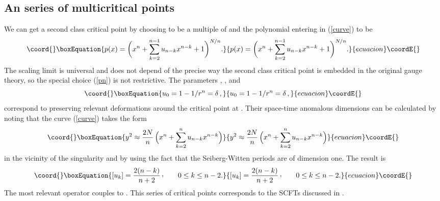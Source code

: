 \documentclass[a4paper,12pt]{article}
\def\cvp{\raise 2pt\hbox{,}}
\begin{document}
{\subsection{An \coordHE{} series of multicritical points}
%
We can get a second class \coordHE{} critical point by choosing \coordHE{} to be a 
multiple of \coordHE{} and the polynomial \coordHE{} entering in (\ref{curve}) to be
%
\begin{equation}\coord{}\boxEquation{
\label{pn}
p(x) = \biggl( x^{n} + \sum_{k=2}^{n-1} u_{n-k} x^{n-k} + 1 \biggr)^{N/n}.
}{
p(x) = \biggl( x^{n} + \sum_{k=2}^{n-1} u_{n-k} x^{n-k} + 1 \biggr)^{N/n}.
}{ecuacion}\coordE{}\end{equation}
%
The scaling limit is universal and does not depend of the precise way the 
second class critical point is embedded in the original gauge theory, so 
the special choice (\ref{pn}) is not restrictive. The parameters \coordHE{}, 
\coordHE{}, and 
%
\begin{equation}\coord{}\boxEquation{
\label{u0def}
u_{0}= 1-1/r^{n} = \delta\, ,
}{
u_{0}= 1-1/r^{n} = \delta\, ,
}{ecuacion}\coordE{}\end{equation}
%
correspond to \coordHE{} preserving relevant deformations around the 
critical point at \coordHE{}. Their space-time anomalous dimensions can
be calculated by noting that the curve (\ref{curve}) takes the form
%
\begin{equation}\coord{}\boxEquation{
\label{singcurve}
y^{2} \approx {2N\over n}\, \Bigl( x^{n} + \sum_{k=2}^{n} u_{n-k}x^{n-k}\Bigr)
}{
y^{2} \approx {2N\over n}\, \Bigl( x^{n} + \sum_{k=2}^{n} u_{n-k}x^{n-k}\Bigr)
}{ecuacion}\coordE{}\end{equation}
%
in the vicinity of the singularity and by using the fact that the 
Seiberg-Witten periods are of dimension one. The result is
%
\begin{equation}\coord{}\boxEquation{
\label{stdim}
[u_{k}] = {2(n-k)\over n+2}\, \cvp\qquad 0\leq k\leq n-2.
}{
[u_{k}] = {2(n-k)\over n+2}\, \cvp\qquad 0\leq k\leq n-2.
}{ecuacion}\coordE{}\end{equation}
%
The most relevant operator couples to \coordHE{}. This series of critical 
points corresponds to the \coordHE{} SCFTs discussed in \cite{SCFT}.

}
\end{document}
